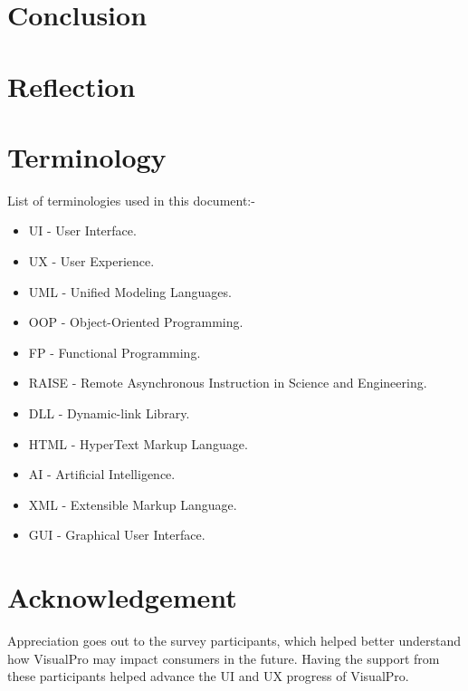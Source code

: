 \documentclass[12pt]{report} %
\begin{document}
	\chapter{Conclusion}

	\chapter{Reflection}

	\chapter{Terminology}
		List of terminologies used in this document:-
		\begin{itemize}
		\item UI - User Interface.
		\item UX - User Experience.
		\item UML - Unified Modeling Languages.
		\item OOP - Object-Oriented Programming.
		\item FP - Functional Programming.
		\item RAISE - Remote Asynchronous Instruction in Science and Engineering.
		\item DLL - Dynamic-link Library.
		\item HTML - HyperText Markup Language.
		\item AI - Artificial Intelligence.
		\item XML - Extensible Markup Language.
		\item GUI - Graphical User Interface.
		\end{itemize}

	\chapter*{Acknowledgement}
		Appreciation goes out to the survey participants, which helped better understand how VisualPro may impact consumers in the future. Having the support from these participants helped advance the UI and UX progress of VisualPro.

\clearpage
\nocite{*}
\small{
}


\end{document}
